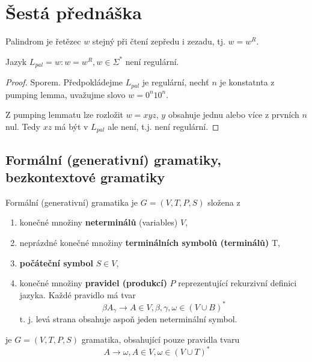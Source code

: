 \documentclass[../main.tex]{subfiles}
\begin{document}
\section{Šestá přednáška}

\begin{definition}[Palindromy]
    Palindrom je řetězec $w$ stejný při čtení zepředu i zezadu, tj. $w = w^R$.
\end{definition}

\begin{theorem}
    Jazyk $L_{pal} = {w : w=w^R, w\in \Sigma^* }$ není regulární.
\end{theorem}
\begin{proof}
    Sporem. Předpokládejme $L_{pal}$ je regulární, nechť $n$ je konstatnta z pumping lemma,
    uvažujme slovo $w = 0^n10^n$.
    
    Z pumping lemmatu lze rozložit $w = xyz$, $y$ obsahuje jednu alebo více z prvních $n$ nul.
    Tedy $xz$ má být v $L_{pal}$ ale není, t.j. není regulární.
\end{proof}

\subsection{Formální (generativní) gramatiky, bezkontextové gramatiky}

\begin{definition}
    Formální (generativní) gramatika je $G = (V,T,P,S)$ složena z
    \begin{enumerate}
        \item konečné množiny \textbf{neterminálů} (variables) $V$,
        \item neprázdné konečné množiny \textbf{terminálních symbolů (terminálů)} T,
        \item \textbf{počáteční symbol} $S \in V$,
        \item konečné množiny \textbf{pravidel (produkcí)} $P$ reprezentující rekurzivní definici jazyka. 
        Každé pravidlo má tvar
        \[\beta A_\gamma \rightarrow A \in V, \beta, \gamma, \omega \in (V \cup B)^*\]
        t. j. levá strana obsahuje aspoň jeden neterminální symbol.
    \end{enumerate}
\end{definition}

\begin{definition}
    je $G = (V,T,P,S)$ gramatika, obsahující pouze pravidla tvaru
    \[A \rightarrow \omega, A \in V, \omega \in (V\cup T)^*\]
\end{definition}
\end{document}
